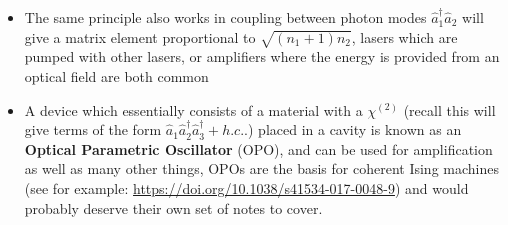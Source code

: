 \documentclass[english]{article}
\begin{document}
\begin{itemize}
\item The same principle also works in coupling between photon modes $\hat{a}^\dagger_1\hat{a}_2$ will give a matrix element proportional to $\sqrt{(n_1+1)n_2}$, lasers which are pumped with other lasers, or amplifiers where the energy is provided from an optical field are both common
\item A device which essentially consists of a material with a $\chi^{(2)}$ (recall this will give terms of the form $\hat{a}_1\hat{a}^\dagger_2\hat{a}^\dagger_3+h.c..$) placed in a cavity is known as an \textbf{Optical Parametric Oscillator} (OPO), and can be used for amplification as well as many other things, OPOs are the basis for coherent Ising machines (see for example: \href{https://doi.org/10.1038/s41534-017-0048-9}{https://doi.org/10.1038/s41534-017-0048-9}) and would probably deserve their own set of notes to cover.
\end{itemize}
\end{document}
